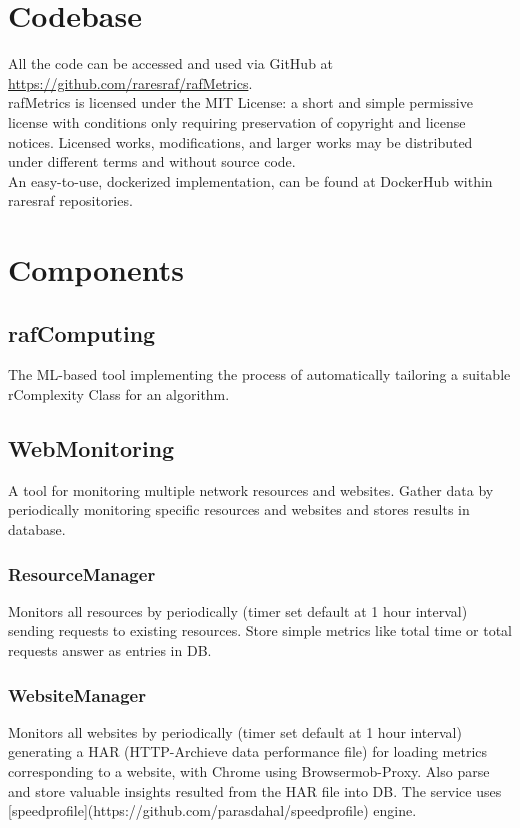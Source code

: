 \section{Codebase}
All the code can be accessed and used via GitHub at \href{https://github.com/raresraf/rafMetrics}{https://github.com/raresraf/rafMetrics}.
\\
rafMetrics is licensed under the MIT License: a short and simple permissive license with conditions only requiring preservation of copyright and license notices. Licensed works, modifications, and larger works may be distributed under different terms and without source code.
\\
An easy-to-use, dockerized implementation, can be found at DockerHub within raresraf repositories.


\section{Components}

\subsection{rafComputing}
The ML-based tool implementing the process of automatically tailoring a suitable rComplexity Class for an algorithm.


\subsection{WebMonitoring}
A tool for monitoring multiple network resources and websites. 
Gather data by periodically monitoring specific resources and websites and stores results in database.

\subsubsection{ResourceManager}
Monitors all resources by periodically (timer set default at 1 hour interval) sending requests to existing resources.
Store simple metrics like total time or total requests answer as entries in DB. 

\subsubsection{WebsiteManager}
Monitors all websites by periodically (timer set default at 1 hour interval) generating a HAR (HTTP-Archieve data performance file) for loading metrics corresponding to a website, with Chrome using Browsermob-Proxy.
Also parse and store valuable insights resulted from the HAR file into DB. 
The service uses [speedprofile](https://github.com/parasdahal/speedprofile) engine.

